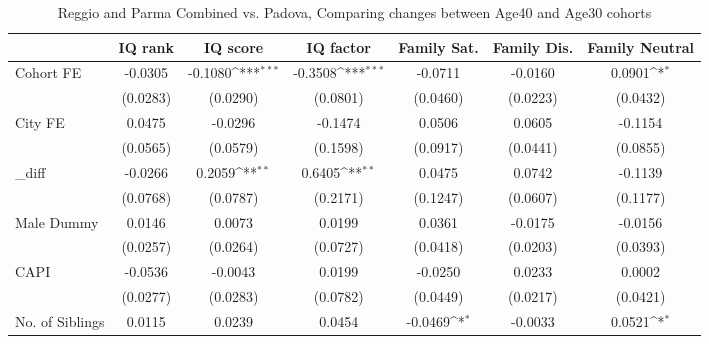 \begin{table}[htbp]\centering
\def\sym#1{\ifmmode^{#1}\else\(^{#1}\)\fi}
\caption{Reggio and Parma Combined vs. Padova, Comparing changes between Age40 and Age30 cohorts}
\begin{tabular}{l*{6}{c}}
\toprule
            &\multicolumn{1}{c}{IQ rank}&\multicolumn{1}{c}{IQ score}&\multicolumn{1}{c}{IQ factor}&\multicolumn{1}{c}{Family Sat.}&\multicolumn{1}{c}{Family Dis.}&\multicolumn{1}{c}{Family Neutral}\\
\midrule
Cohort FE   &     -0.0305         &     -0.1080\sym{***}&     -0.3508\sym{***}&     -0.0711         &     -0.0160         &      0.0901\sym{*}  \\
            &    (0.0283)         &    (0.0290)         &    (0.0801)         &    (0.0460)         &    (0.0223)         &    (0.0432)         \\
\addlinespace
City FE     &      0.0475         &     -0.0296         &     -0.1474         &      0.0506         &      0.0605         &     -0.1154         \\
            &    (0.0565)         &    (0.0579)         &    (0.1598)         &    (0.0917)         &    (0.0441)         &    (0.0855)         \\
\addlinespace
\_diff       &     -0.0266         &      0.2059\sym{**} &      0.6405\sym{**} &      0.0475         &      0.0742         &     -0.1139         \\
            &    (0.0768)         &    (0.0787)         &    (0.2171)         &    (0.1247)         &    (0.0607)         &    (0.1177)         \\
\addlinespace
Male Dummy  &      0.0146         &      0.0073         &      0.0199         &      0.0361         &     -0.0175         &     -0.0156         \\
            &    (0.0257)         &    (0.0264)         &    (0.0727)         &    (0.0418)         &    (0.0203)         &    (0.0393)         \\
\addlinespace
CAPI        &     -0.0536         &     -0.0043         &      0.0199         &     -0.0250         &      0.0233         &      0.0002         \\
            &    (0.0277)         &    (0.0283)         &    (0.0782)         &    (0.0449)         &    (0.0217)         &    (0.0421)         \\
\addlinespace
No. of Siblings&      0.0115         &      0.0239         &      0.0454         &     -0.0469\sym{*}  &     -0.0033         &      0.0521\sym{*}  \\

\end{tabular}
\end{table}
